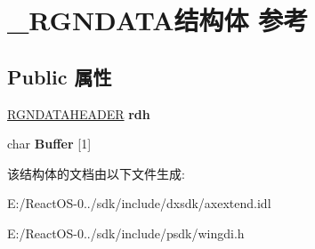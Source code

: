 \hypertarget{struct___r_g_n_d_a_t_a}{}\section{\+\_\+\+R\+G\+N\+D\+A\+T\+A结构体 参考}
\label{struct___r_g_n_d_a_t_a}
\subsection*{Public 属性}
\begin{DoxyCompactItemize}
\item 
\mbox{\label{struct___r_g_n_d_a_t_a_a25f0d32117298e49eae83e1c79f17866}} 
\hyperlink{struct___r_g_n_d_a_t_a_h_e_a_d_e_r}{R\+G\+N\+D\+A\+T\+A\+H\+E\+A\+D\+ER} {\bfseries rdh}
\item 
\mbox{\label{struct___r_g_n_d_a_t_a_ac4b148f3ecda7316f7f4e6374daacefd}} 
char {\bfseries Buffer} \mbox{[}1\mbox{]}
\end{DoxyCompactItemize}


该结构体的文档由以下文件生成\+:\begin{DoxyCompactItemize}
\item 
E\+:/\+React\+O\+S-\/0../sdk/include/dxsdk/axextend.\+idl\item 
E\+:/\+React\+O\+S-\/0../sdk/include/psdk/wingdi.\+h\end{DoxyCompactItemize}
